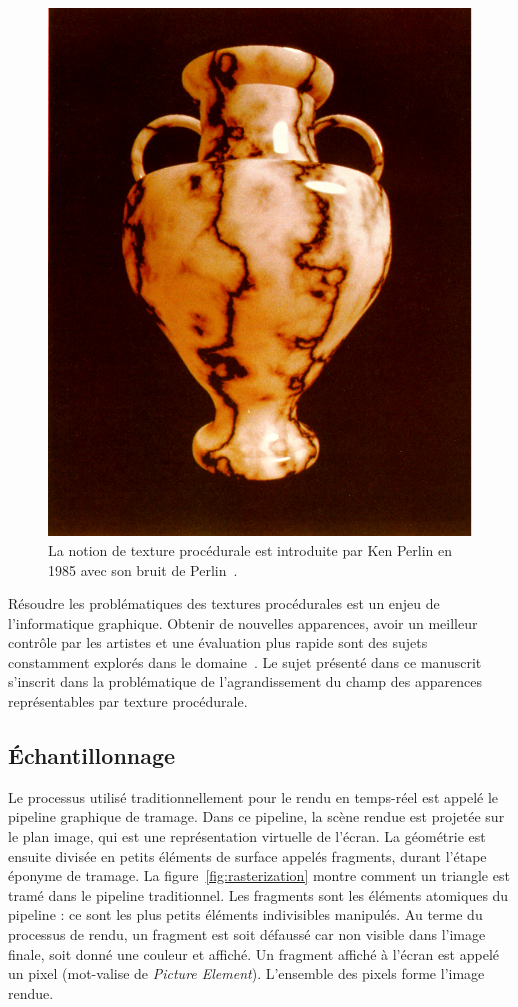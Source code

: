 \begin{figure}[h]
    \centering
    \includegraphics[width=.5\textwidth]{contenu/resources/images/perlin-noise}
    \caption[Bruit de Perlin]{La notion de texture procédurale est introduite par Ken Perlin en 1985 avec son bruit de Perlin~\cite{perlin_image_1985}.}
    \label{fig:perlin-noise}
\end{figure}

Résoudre les problématiques des textures procédurales est un enjeu de l'informatique graphique. Obtenir de nouvelles apparences, avoir un meilleur contrôle par les artistes et une évaluation plus rapide sont des sujets constamment explorés dans le domaine~\cite{heitz_high-performance_2018, tricard_procedural_2019, lutz_cyclostationary-gaussian_2021, baldi_differentiable_2023}. Le sujet présenté dans ce manuscrit s'inscrit dans la problématique de l'agrandissement du champ des apparences représentables par texture procédurale.

\subsection{Échantillonnage}

Le processus utilisé traditionnellement pour le rendu en temps-réel est appelé le pipeline graphique de tramage. Dans ce pipeline, la scène rendue est projetée sur le plan image, qui est une représentation virtuelle de l'écran. La géométrie est ensuite divisée en petits éléments de surface appelés fragments, durant l'étape éponyme de tramage. La figure~\ref{fig:rasterization} montre comment un triangle est tramé dans le pipeline traditionnel. Les fragments sont les éléments atomiques du pipeline : ce sont les plus petits éléments indivisibles manipulés. Au terme du processus de rendu, un fragment est soit défaussé car non visible dans l'image finale, soit donné une couleur et affiché. Un fragment affiché à l'écran est appelé un pixel (mot-valise de \textit{Picture Element}). L'ensemble des pixels forme l'image rendue.


